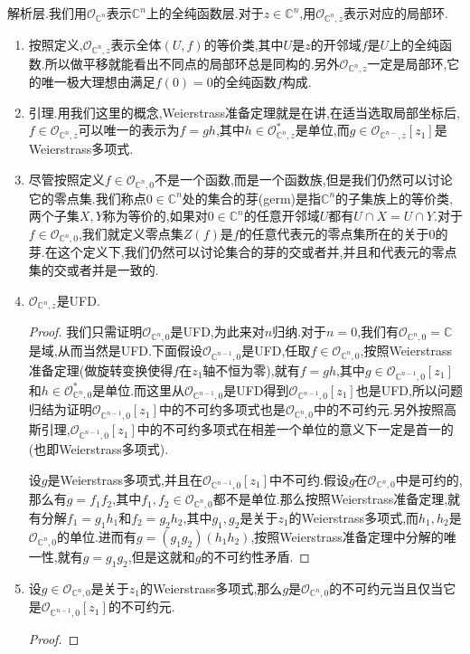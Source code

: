 解析层.我们用$\mathscr{O}_{\mathbb{C}^n}$表示$\mathbb{C}^n$上的全纯函数层.对于$z\in\mathbb{C}^n$,用$\mathscr{O}_{\mathbb{C}^n,z}$表示对应的局部环.
\begin{enumerate}
	\item 按照定义,$\mathscr{O}_{\mathbb{C}^n,z}$表示全体$(U,f)$的等价类,其中$U$是$z$的开邻域$f$是$U$上的全纯函数.所以做平移就能看出不同点的局部环总是同构的.另外$\mathscr{O}_{\mathbb{C}^n,z}$一定是局部环,它的唯一极大理想由满足$f(0)=0$的全纯函数$f$构成.
	\item 引理.用我们这里的概念,Weierstrass准备定理就是在讲,在适当选取局部坐标后,$f\in\mathscr{O}_{\mathbb{C}^n,z}$可以唯一的表示为$f=gh$,其中$h\in\mathscr{O}_{\mathbb{C}^n,z}^*$是单位,而$g\in\mathscr{O}_{\mathbb{C}^{n-},z}[z_1]$是Weierstrass多项式.
	\item 尽管按照定义$f\in\mathscr{O}_{\mathbb{C}^n,0}$不是一个函数,而是一个函数族,但是我们仍然可以讨论它的零点集.我们称点$0\in\mathbb{C}^n$处的集合的芽(germ)是指$\mathbb{C}^n$的子集族上的等价类,两个子集$X,Y$称为等价的,如果对$0\in\mathbb{C}^n$的任意开邻域$U$都有$U\cap X=U\cap Y$.对于$f\in\mathscr{O}_{\mathbb{C}^n,0}$,我们就定义零点集$Z(f)$是$f$的任意代表元的零点集所在的关于0的芽.在这个定义下,我们仍然可以讨论集合的芽的交或者并,并且和代表元的零点集的交或者并是一致的.
	\item $\mathscr{O}_{\mathbb{C}^n,z}$是UFD.
	\begin{proof}
		
		我们只需证明$\mathscr{O}_{\mathbb{C}^n,0}$是UFD,为此来对$n$归纳.对于$n=0$,我们有$\mathscr{O}_{\mathbb{C}^n,0}=\mathbb{C}$是域,从而当然是UFD.下面假设$\mathscr{O}_{\mathbb{C}^{n-1},0}$是UFD,任取$f\in\mathscr{O}_{\mathbb{C}^n,0}$,按照Weierstrass准备定理(做旋转变换使得$f$在$z_1$轴不恒为零),就有$f=gh$,其中$g\in\mathscr{O}_{\mathbb{C}^{n-1},0}[z_1]$和$h\in\mathscr{O}_{\mathbb{C}^n,0}^*$是单位.而这里从$\mathscr{O}_{\mathbb{C}^{n-1},0}$是UFD得到$\mathscr{O}_{\mathbb{C}^{n-1},0}[z_1]$也是UFD,所以问题归结为证明$\mathscr{O}_{\mathbb{C}^{n-1},0}[z_1]$中的不可约多项式也是$\mathscr{O}_{\mathbb{C}^n,0}$中的不可约元.另外按照高斯引理,$\mathscr{O}_{\mathbb{C}^{n-1},0}[z_1]$中的不可约多项式在相差一个单位的意义下一定是首一的(也即Weierstrass多项式).
		
		\qquad
		
		设$g$是Weierstrass多项式,并且在$\mathscr{O}_{\mathbb{C}^{n-1},0}[z_1]$中不可约.假设$g$在$\mathscr{O}_{\mathbb{C}^n,0}$中是可约的,那么有$g=f_1f_2$,其中$f_1,f_2\in\mathscr{O}_{\mathbb{C}^n,0}$都不是单位.那么按照Weierstrass准备定理,就有分解$f_1=g_1h_1$和$f_2=g_2h_2$,其中$g_1,g_2$是关于$z_1$的Weierstrass多项式,而$h_1,h_2$是$\mathscr{O}_{\mathbb{C}^n,0}$的单位.进而有$g=(g_1g_2)(h_1h_2)$,按照Weierstrass准备定理中分解的唯一性,就有$g=g_1g_2$,但是这就和$g$的不可约性矛盾.
	\end{proof}
    \item 设$g\in\mathscr{O}_{\mathbb{C}^n,0}$是关于$z_1$的Weierstrass多项式,那么$g$是$\mathscr{O}_{\mathbb{C}^n,0}$的不可约元当且仅当它是$\mathscr{O}_{\mathbb{C}^{n-1},0}[z_1]$的不可约元.
    \begin{proof}
    	

\end{proof}
\end{enumerate}
